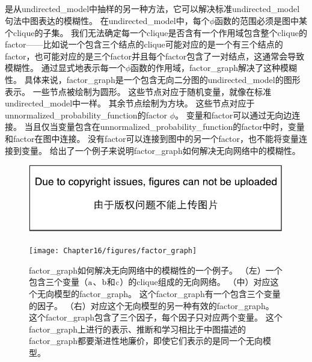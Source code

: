 \subsection{}
\label{sec:factor_graphs}



是从\gls{undirected_model}中抽样的另一种方法，它可以解决标准\gls{undirected_model}句法中图表达的模糊性。
在\gls{undirected_model}中，每个$\phi$函数的范围必须是图中某个\gls{clique}的子集。
我们无法确定每一个\gls{clique}是否含有一个作用域包含整个\gls{clique}的\gls{factor}——比如说一个包含三个结点的\gls{clique}可能对应的是一个有三个结点的\gls{factor}，也可能对应的是三个\gls{factor}并且每个\gls{factor}包含了一对结点，这通常会导致模糊性。
通过显式地表示每一个$\phi$函数的作用域，\gls{factor_graph}解决了这种模糊性。
具体来说，\gls{factor_graph}是一个包含无向二分图的\gls{undirected_model}的图形表示。
一些节点被绘制为圆形。 
这些节点对应于随机变量，就像在标准\gls{undirected_model}中一样。
其余节点绘制为方块。
这些节点对应于\gls{unnormalized_probability_function}的\gls{factor} $\phi$。
变量和\gls{factor}可以通过无向边连接。
当且仅当变量包含在\gls{unnormalized_probability_function}的\gls{factor}中时，变量和\gls{factor}在图中连接。
没有\gls{factor}可以连接到图中的另一个\gls{factor}，也不能将变量连接到变量。
给出了一个例子来说明\gls{factor_graph}如何解决无向网络中的模糊性。


\begin{figure}[!htb]
\ifOpenSource
\centerline{\includegraphics{figure.pdf}}
\else
	\centerline{\texttt{[image: Chapter16/figures/factor\_graph]}}	
\fi
\caption{\gls{factor_graph}如何解决无向网络中的模糊性的一个例子。
（左）一个包含三个变量（$\mathrm{a}$、$\mathrm{b}$和$\mathrm{c}$）的\gls{clique}组成的无向网络。
（中）对应这个无向模型的\gls{factor_graph}。
这个\gls{factor_graph}有一个包含三个变量的因子。
（右）对应这个无向模型的另一种有效的\gls{factor_graph}。
这个\gls{factor_graph}包含了三个因子，每个因子只对应两个变量。
这个\gls{factor_graph}上进行的表示、推断和学习相比于中图描述的\gls{factor_graph}都要渐进性地廉价，即使它们表示的是同一个无向模型。}
	\label{fig:factor_graph}
\end{figure}


